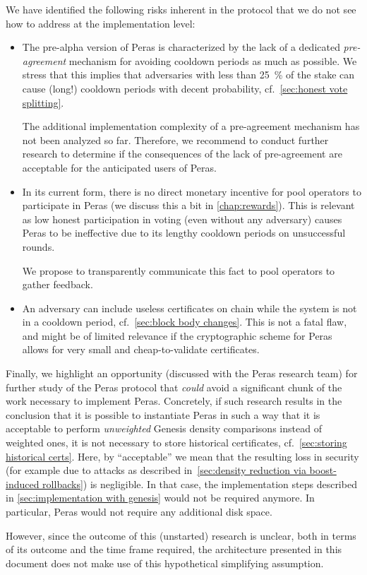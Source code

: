 We have identified the following risks inherent in the protocol that we do not see how to address at the implementation level:
\begin{itemize}
\item
  The pre-alpha version of Peras is characterized by the lack of a dedicated \emph{pre-agreement} mechanism for avoiding cooldown periods as much as possible.
  We stress that this implies that adversaries with less than \qty{25}{\percent} of the stake can cause (long!) cooldown periods with decent probability, cf.~\cref{sec:honest vote splitting}.

  The additional implementation complexity of a pre-agreement mechanism has not been analyzed so far.
  Therefore, we recommend to conduct further research to determine if the consequences of the lack of pre-agreement are acceptable for the anticipated users of Peras.
\item
  In its current form, there is no direct monetary incentive for pool operators to participate in Peras (we discuss this a bit in \cref{chap:rewards}).
  This is relevant as low honest participation in voting (even without any adversary) causes Peras to be ineffective due to its lengthy cooldown periods on unsuccessful rounds.

  We propose to transparently communicate this fact to pool operators to gather feedback.
\item
  An adversary can include useless certificates on chain while the system is not in a cooldown period, cf.~\cref{sec:block body changes}.
  This is not a fatal flaw, and might be of limited relevance if the cryptographic scheme for Peras allows for very small and cheap-to-validate certificates.
\end{itemize}

Finally, we highlight an opportunity (discussed with the Peras research team) for further study of the Peras protocol that \emph{could} avoid a significant chunk of the work necessary to implement Peras.
Concretely, if such research results in the conclusion that it is possible to instantiate Peras in such a way that it is acceptable to perform \emph{unweighted} Genesis density comparisons instead of weighted ones, it is not necessary to store historical certificates, cf.~\cref{sec:storing historical certs}.
Here, by \enquote{acceptable} we mean that the resulting loss in security (for example due to attacks as described in~\cref{sec:density reduction via boost-induced rollbacks}) is negligible.
In that case, the implementation steps described in \cref{sec:implementation with genesis} would not be required anymore.
In particular, Peras would not require any additional disk space.

However, since the outcome of this (unstarted) research is unclear, both in terms of its outcome and the time frame required, the architecture presented in this document does not make use of this hypothetical simplifying assumption.

